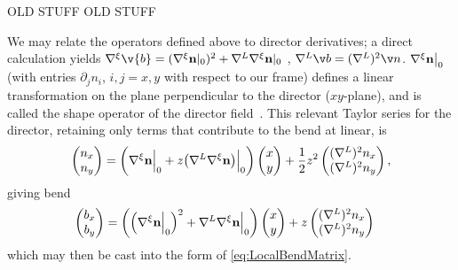 

OLD STUFF OLD STUFF




 We may relate the operators defined above to director derivatives; a direct calculation yields $\nabla^\xi \v{b} = (\nabla^\xi{\bf n}|_{0})^2+\nabla^L \nabla^\xi{\bf n}|_{0}$ , $\nabla^L \v b = (\nabla^L)^2 \v n$. $\nabla^{\xi}{\bf n} \bigr|_{0}$ (with entries $\partial_j n_i$, $i,j=x,y$ with respect to our frame) defines a linear transformation on the plane perpendicular to the director ($xy$-plane), and is called the shape operator of the director field~\cite{machon16,alexander18}. This relevant Taylor series for the director, retaining only terms that contribute to the bend at linear, is
\begin{align}
\begin{pmatrix} n_x \\ n_y \end{pmatrix} & = \biggl( \Bigl. \nabla^\xi {\bf n} \Bigr\rvert_0 + z \Bigl. \bigl( \nabla^L\nabla^\xi {\bf n} \bigr) \Bigr\rvert_0 \biggr) \begin{pmatrix} x \\ y \end{pmatrix} + \frac{1}{2} z^2 \begin{pmatrix} (\nabla^L)^2 n_x \\ (\nabla^L)^2 n_y \end{pmatrix}, \\
\end{align}
giving bend
\begin{align}
\begin{pmatrix}b_x \\ b_y\end{pmatrix} & =
 \biggl( \Big( \Bigl. \nabla^\xi {\bf n} \Bigr\rvert_0 \Big)^2 + \Bigl. \nabla^L\nabla^\xi {\bf n} \Bigr\rvert_0 \biggr) \begin{pmatrix} x \\ y \end{pmatrix}
 + z \begin{pmatrix}(\nabla^L)^2 n_x \\ (\nabla^L)^2 n_y \end{pmatrix}
\label{eq:LocalBend}
\end{align}
which may then be cast into the form of \eqref{eq:LocalBendMatrix}.

